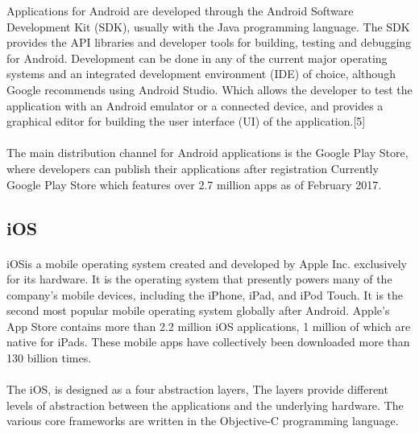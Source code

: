 Applications for Android are developed through the Android Software
Development Kit (SDK), usually with the Java programming language. The
SDK provides the API libraries and developer tools for building, testing and
debugging for Android. Development can be done in any of the current major
operating systems and an integrated development environment (IDE) of
choice, although Google recommends using Android Studio.
Which  allows the developer to test the application with an Android emulator or a connected device,
and provides a graphical editor for building the user interface (UI) of the application.[5]

\paragraph{}
The main distribution channel for Android applications is the Google Play Store, where developers can publish their applications after registration
Currently Google Play Store which features over 2.7 million apps as of February 2017.


\subsection{iOS}

\paragraph{}
iOSis a mobile operating system created and developed by Apple Inc. exclusively for its hardware.
It is the operating system that presently powers many of the company's mobile devices, including the iPhone, iPad, and iPod Touch.
It is the second most popular mobile operating system globally after Android. Apple's App Store contains more than 2.2 million iOS applications, 1 million of which are native for iPads.
These mobile apps have collectively been downloaded more than 130 billion times.

\paragraph{}
The iOS, is designed as a four abstraction layers,  The layers provide different  levels of abstraction between the applications and the underlying hardware.
The various core frameworks are written in the Objective-C programming language.

